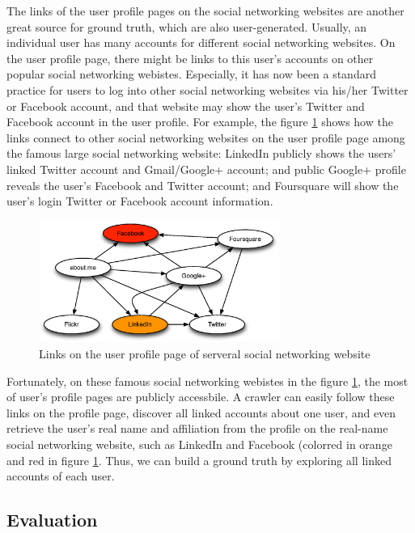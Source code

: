 \documentclass[11pt,letterpaper]{article}
\begin{document}
The links of the user profile pages on the social networking websites are another great source for ground truth, which are also user-generated. Usually, an individual user has many accounts for different social networking websites. On the user profile page, there might be links to this user's accounts on other popular social networking webistes. Especially, it has now been a standard practice for users to log into other social networking websites via his/her Twitter or Facebook account, and that website may show the user's Twitter and Facebook account in the user profile. For example, the figure \ref{fig:infer} shows how the links connect to other social networking websites on the user profile page among the famous large social networking website: LinkedIn publicly shows the users' linked Twitter account and Gmail/Google+ account; and public Google+ profile reveals the user's Facebook and Twitter account; and Foursquare will show the user's login Twitter or Facebook account information. 

\begin{figure}[h!]
\centering
\caption{Links on the user profile page of serveral social networking website}
\label{fig:infer}
\includegraphics[width=0.7\textwidth]{fig/infer.eps}
\end{figure}


Fortunately, on these famous social networking webistes in the figure \ref{fig:infer}, the most of user's profile pages are publicly accessbile. A crawler can easily follow these links on the profile page, discover all linked accounts about one user, and even retrieve the user's real name and affiliation from the profile on the real-name social networking website, such as LinkedIn and Facebook (colorred in orange and red in figure \ref{fig:infer}. Thus, we can build a ground truth by exploring all linked accounts of each user. 

\subsection{Evaluation}
\end{document}
